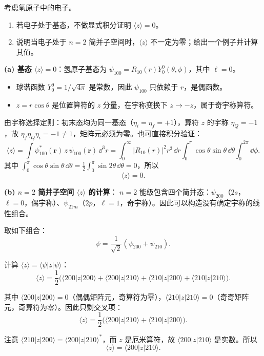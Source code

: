 \begin{question}
考虑氢原子中的电子。
\begin{enumerate}
\item 若电子处于基态，不做显式积分证明 $\langle z\rangle=0$。
\item 说明当电子处于 $n=2$ 简并子空间时，$\langle z\rangle$ 不一定为零；给出一个例子并计算其值。
\end{enumerate}
\end{question}
\begin{solution}
	\textbf{(a) 基态 $\langle z\rangle=0$}：氢原子基态为 $\psi_{100}=R_{10}(r)Y_0^0(\theta,\phi)$，其中 $\ell=0$。
	\begin{itemize}
	\item 球谐函数 $Y_0^0=1/\sqrt{4\pi}$ 是常数，因此 $\psi_{100}$ 只依赖于 $r$，是偶函数。
	\item $z=r\cos\theta$ 是位置算符的 $z$ 分量，在宇称变换下 $z\to -z$，属于奇宇称算符。
	\end{itemize}

	由宇称选择定则：初末态均为同一基态（$\eta_i=\eta_f=+1$），算符 $z$ 的宇称 $\eta_Q=-1$，故 $\eta_f\eta_Q\eta_i=-1\neq1$，矩阵元必须为零。也可直接积分验证：
	\[
	\langle z\rangle = \int \psi_{100}^*(\mathbf r)\,z\,\psi_{100}(\mathbf r)\,\dd^3 r
	= \int_0^\infty |R_{10}(r)|^2 r^3\,\dd r\int_0^\pi \cos\theta\sin\theta\,\dd\theta\int_0^{2\pi}\dd\phi.
	\]
	其中 $\int_0^\pi\cos\theta\sin\theta\,\dd\theta = \frac12\int_0^\pi\sin2\theta\,\dd\theta=0$，所以
	\[
	\boxed{\langle z\rangle = 0}.
	\]

	\textbf{(b) $n=2$ 简并子空间 $\langle z\rangle$ 的计算}：
	$n=2$ 能级包含四个简并态：$\psi_{200}$（$2s$，$\ell=0$，偶宇称）、$\psi_{21m}$（$2p$，$\ell=1$，奇宇称）。因此可以构造没有确定宇称的线性组合。

	取如下组合：
	\[
	\psi = \frac{1}{\sqrt{2}}(\psi_{200}+\psi_{210}).
	\]

	计算 $\langle z\rangle = \langle\psi|z|\psi\rangle$：
	\[
	\langle z\rangle = \frac12\Big(\langle200|z|200\rangle + \langle200|z|210\rangle + \langle210|z|200\rangle + \langle210|z|210\rangle\Big).
	\]

	其中 $\langle200|z|200\rangle=0$（偶偶矩阵元，奇算符为零），$\langle210|z|210\rangle=0$（奇奇矩阵元，奇算符为零）。因此只剩交叉项：
	\[
	\langle z\rangle = \frac12\Big(\langle200|z|210\rangle + \langle210|z|200\rangle\Big).
	\]

	注意 $\langle210|z|200\rangle = \langle200|z|210\rangle^*$，而 $z$ 是厄米算符，故 $\langle200|z|210\rangle$ 是实数。所以
	\[
	\langle z\rangle = \langle200|z|210\rangle.
	\]


\end{solution}
